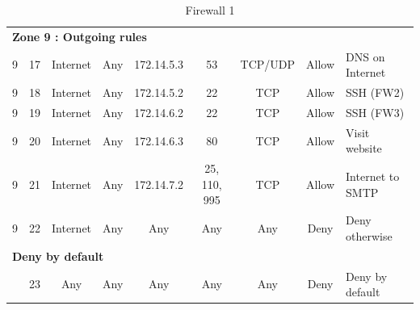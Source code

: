 \documentclass[a4paper,titlepage]{article}
\begin{document}
\begin{table}[h]
\begin{tabular}{c|c|cc|cc|ccl}
		\hline
		\multicolumn{9}{l}{\textbf{Zone 9 : Outgoing rules}}\\
		9 & 17 & Internet & Any & 172.14.5.3 & 53 & TCP/UDP & Allow & DNS on Internet\\
		9 & 18 & Internet & Any & 172.14.5.2 & 22 & TCP & Allow & SSH (FW2)\\
		9 & 19 & Internet & Any & 172.14.6.2 & 22 & TCP & Allow & SSH (FW3)\\
		9 & 20 & Internet & Any & 172.14.6.3 & 80 & TCP & Allow & Visit website\\
		9 & 21 & Internet & Any & 172.14.7.2 & 25, 110, 995 & TCP & Allow & Internet to SMTP\\
		9 & 22 & Internet & Any & Any & Any & Any & Deny & Deny otherwise\\

		\multicolumn{9}{l}{\textbf{Deny by default}}\\
		  & 23 & Any & Any & Any & Any & Any & Deny & Deny by default\\
		\hline
	\end{tabular}
	\caption{Firewall 1}
\end{table}

\end{document}

